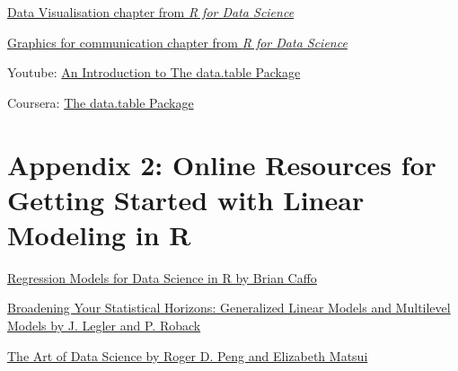 \documentclass[]{book}
\theoremstyle{definition}
\theoremstyle{definition}
\theoremstyle{definition}
\theoremstyle{remark}
\begin{document}
\href{http://r4ds.had.co.nz/data-visualisation.html}{Data Visualisation
chapter from \emph{R for Data Science}}

\href{http://r4ds.had.co.nz/graphics-for-communication.html}{Graphics
for communication chapter from \emph{R for Data Science}}

Youtube: \href{https://www.youtube.com/watch?v=pc1ARG6kbAM}{An
Introduction to The data.table Package}

Coursera:
\href{https://www.coursera.org/learn/data-cleaning/lecture/trMZ7/the-data-table-package}{The
data.table Package}

\chapter*{Appendix 2: Online Resources for Getting Started with Linear
Modeling in
R}\label{appendix-2-online-resources-for-getting-started-with-linear-modeling-in-r}

\href{https://leanpub.com/regmods}{Regression Models for Data Science in
R by Brian Caffo}

\href{https://bookdown.org/roback/bookdown-bysh/}{Broadening Your
Statistical Horizons: Generalized Linear Models and Multilevel Models by
J. Legler and P. Roback}

\href{https://bookdown.org/rdpeng/artofdatascience/}{The Art of Data
Science by Roger D. Peng and Elizabeth Matsui}


\end{document}
